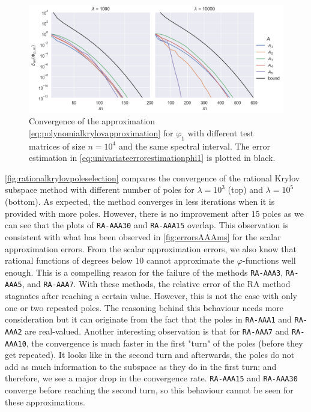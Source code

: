 \begin{figure}[h]
    \centering
    \includegraphics[width=.9\textwidth]{img/krylovapproximation/cnvg_matrices_PA_n10000.png}
    \caption{Convergence of the approximation \eqref{eq:polynomialkrylovapproximation}
    for $\varphi_1$ with different test matrices of size $n=10^4$ and the same spectral interval.
    The error estimation in \eqref{eq:univariateerrorestimationphi1} is plotted in black.}
    \label{fig:krylovapproximationmatrices}
\end{figure}

\autoref{fig:rationalkrylovpoleselection} compares the convergence of the
rational Krylov subspace method with different number of poles for $\lambda=10^3$ (top)
and $\lambda=10^5$ (bottom).
As expected, the method converges in less iterations when it is provided with more poles.
However, there is no improvement after $15$ poles as we can see that the plots of \texttt{RA-AAA30}
and \texttt{RA-AAA15} overlap. This observation is consistent with what has been observed
in \autoref{fig:errorsAAAms} for the scalar approximation errors.
From the scalar approximation errors, we also know that rational functions of degrees below
$10$ cannot approximate the $\varphi$-functions well enough. This is a compelling reason
for the failure of the methods \texttt{RA-AAA3}, \texttt{RA-AAA5}, and \texttt{RA-AAA7}.
With these methods, the relative error of the RA method stagnates after reaching a certain
value. However, this is not the case with only one or two repeated poles. The reasoning behind
this behaviour needs more consideration but it can originate from the fact that the poles
in \texttt{RA-AAA1} and \texttt{RA-AAA2} are real-valued.
Another interesting observation is that for \texttt{RA-AAA7} and \texttt{RA-AAA10}, the convergence
is much faster in the first "turn" of the poles (before they get repeated). It looks like
in the second turn and afterwards, the poles do not add as much information to the subspace
as they do in the first turn; and therefore, we see a major drop in the convergence rate.
\texttt{RA-AAA15} and \texttt{RA-AAA30} converge before reaching the second turn, so this
behaviour cannot be seen for these approximations.

